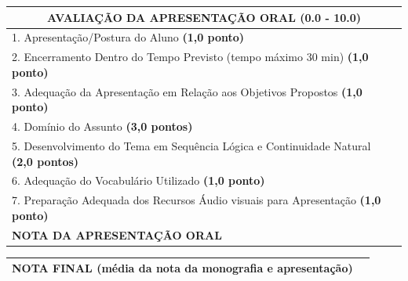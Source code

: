 \begin{table}[!ht]
    \centering
    \begin{tabular}{|p{\sizeA}|p{\sizeB}|}
    \hline        
        \multicolumn{2}{|c|}{\parbox[c][\sizeC][c]{0.9\textwidth}{\centering\textbf{AVALIAÇÃO DA APRESENTAÇÃO ORAL (0.0 - 10.0)}}}  \\ \hline
        
        \parbox[c][\sizeC][c]{\sizeA}{1. Apresentação/Postura do Aluno \textbf{(1,0 ponto)}} & \parbox[c][\sizeC][c]{\sizeB}{}     \\ \hline        
        
        \parbox[c][\sizeC][c]{\sizeA}{2. Encerramento Dentro do Tempo Previsto (tempo máximo 30 min) \textbf{(1,0 ponto)}} & \parbox[c][\sizeC][c]{\sizeB}{}     \\ \hline     
        
        \parbox[c][\sizeC][c]{\sizeA}{3. Adequação da Apresentação em Relação aos Objetivos Propostos \textbf{(1,0 ponto)}} & \parbox[c][\sizeC][c]{\sizeB}{}     \\ \hline        

        \parbox[c][\sizeC][c]{\sizeA}{4. Domínio do Assunto \textbf{(3,0 pontos)}} & \parbox[c][\sizeC][c]{\sizeB}{}     \\ \hline        
        
        \parbox[c][\sizeC][c]{\sizeA}{5. Desenvolvimento do Tema em Sequência Lógica e Continuidade Natural \textbf{(2,0 pontos)}} & \parbox[c][\sizeC][c]{\sizeB}{}     \\ \hline        

        \parbox[c][\sizeC][c]{\sizeA}{6. Adequação do Vocabulário Utilizado \textbf{(1,0 ponto)}} & \parbox[c][\sizeC][c]{\sizeB}{}     \\ \hline        

        \parbox[c][\sizeC][c]{\sizeA}{7. Preparação Adequada dos Recursos Áudio visuais para Apresentação \textbf{(1,0 ponto)}} & \parbox[c][\sizeC][c]{\sizeB}{}     \\ \hline        
        
        \parbox[c][\sizeC][c]{\sizeA}{\centering\textbf{NOTA DA APRESENTAÇÃO ORAL}} & \parbox[c][\sizeC][c]{\sizeB}{}     \\ %
        
    \hline
    \end{tabular}
\end{table}%
%
\begin{table}[!ht]
    \centering
\vspace*{18mm}
    \begin{tabular}{|p{\sizeA}|p{\sizeB}|}
    \hline            
        
        \parbox[c][\sizeC][c]{\sizeA}{\hfill\textbf{NOTA FINAL (média da nota da monografia e apresentação)}} & \parbox[c][\sizeC][c]{\sizeB}{}     \\ %
        
    \hline
    \end{tabular}
\end{table}

